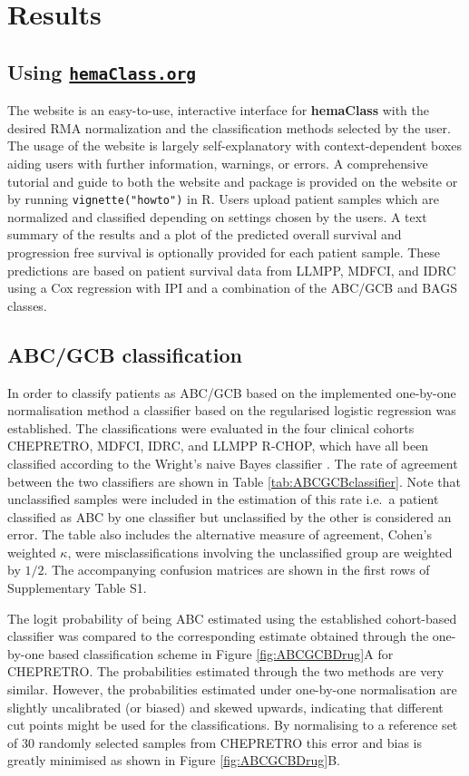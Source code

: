 \documentclass[twocolumn]{bmcart}%
\newcommand{\hemaClass}{\href{http://hemaClass.org}{\texttt{hemaClass.org}}}
\newcommand{\R}{\textsf{R}}
\newcommand{\pkg}[1]{\textbf{#1}}
\begin{document}
\section{Results}
\subsection{Using \hemaClass{}}
The website is an easy-to-use, interactive interface for \pkg{hemaClass} with the desired RMA normalization and the classification methods selected by the user.
The usage of the website is largely self-explanatory with context-dependent boxes aiding users with further information, warnings, or errors.
A comprehensive tutorial and guide to both the website and package is provided on the website or by running \texttt{vignette("howto")} in \R{}.
Users upload patient samples which are normalized and classified depending on settings chosen by the users.
A text summary of the results and a plot of the predicted overall survival and progression free survival is optionally provided for each patient sample.
These predictions are based on patient survival data from LLMPP, MDFCI, and IDRC using a Cox regression with IPI and a combination of the ABC/GCB and BAGS classes.



\subsection{ABC/GCB classification}
In order to classify patients as ABC/GCB based on the implemented one-by-one normalisation method a classifier based on the regularised logistic regression was established.
The classifications were evaluated in the four clinical cohorts CHEPRETRO, MDFCI, IDRC, and LLMPP R-CHOP, which have all been classified according to the Wright's naive Bayes classifier \cite{Wright2003,Lenz2008a}.
The rate of agreement between the two classifiers are shown in Table \ref{tab:ABCGCBclassifier}.
Note that unclassified samples were included in the estimation of this rate i.e.\ a patient classified as ABC by one classifier but unclassified by the other is considered an error.
The table also includes the alternative measure of agreement, Cohen's weighted $\kappa$, were misclassifications involving the unclassified group are weighted by $1/2$.
The accompanying confusion matrices are shown in the first rows of Supplementary Table S1.%

The logit probability of being ABC estimated using the established cohort-based classifier was compared to the corresponding estimate obtained through the one-by-one based classification scheme in Figure \ref{fig:ABCGCBDrug}A for CHEPRETRO.
The probabilities estimated through the two methods are very similar.
However, the probabilities estimated under one-by-one normalisation are slightly uncalibrated (or biased) and skewed upwards, indicating that different cut points might be used for the classifications.
By normalising to a reference set of $30$ randomly selected samples from CHEPRETRO this error and bias is greatly minimised as shown in Figure \ref{fig:ABCGCBDrug}B.
\end{document}

